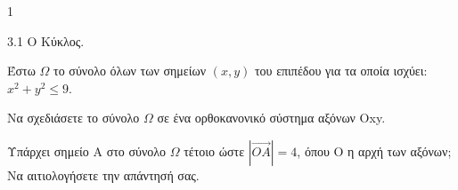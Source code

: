 \begin{ylh}{1}
    \item 3.1 Ο Κύκλος.
\end{ylh}
Έστω $\Omega$ το σύνολο όλων των σημείων $(x, y)$ του επιπέδου για τα οποία ισχύει: $x^2 + y^2 \le 9$.
\begin{alist}
\item Να σχεδιάσετε το σύνολο $\Omega$ σε ένα ορθοκανονικό σύστημα αξόνων Oxy. 
\item Υπάρχει σημείο A στο σύνολο $\Omega$ τέτοιο ώστε $|\vec{OA}| = 4$, όπου O η αρχή των αξόνων; Να αιτιολογήσετε την απάντησή σας. 
\end{alist}